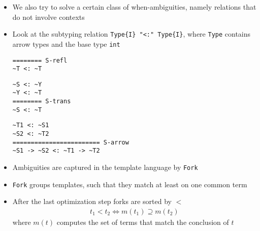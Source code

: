 \documentclass{beamer}
\begin{document}
\begin{frame}
\begin{itemize}
\item We also try to solve a certain class of when-ambiguities, namely
  relations that do not involve contexts
\item Look at the subtyping relation \verb|Type{I} "<:" Type{I}|,
  where \verb|Type| contains arrow types and the base type \verb|int|
  \begin{minipage}[b]{.4\linewidth}
\begin{lstlisting}[language=sltc]
======== S-refl
~T <: ~T
\end{lstlisting}
  \end{minipage}
  \begin{minipage}[b]{.4\linewidth}
\begin{lstlisting}[language=sltc]
~S <: ~Y
~Y <: ~T
======== S-trans
~S <: ~T
\end{lstlisting}
  \end{minipage}
  \begin{lstlisting}[language=sltc]
~T1 <: ~S1
~S2 <: ~T2
======================== S-arrow
~S1 -> ~S2 <: ~T1 -> ~T2
  \end{lstlisting}
\end{itemize}

\framebreak{}

\begin{itemize}
\item Ambiguities are captured in the template language by \verb|Fork|
\item \verb|Fork| groups templates, such that they match at least on
  one common term
\item After the last optimization step forks are sorted by $<$
  \begin{align}
    t_1 < t_2 \iff m(t_1) \supseteq m(t_2)
  \end{align}
  where $m(t)$ computes the set of terms that match the conclusion of $t$
\end{itemize}
\end{frame}

\renewcommand*\selectConstraintGeneration{orange}
\renewcommand*\selectConstraintGeneration{}
\end{document}
